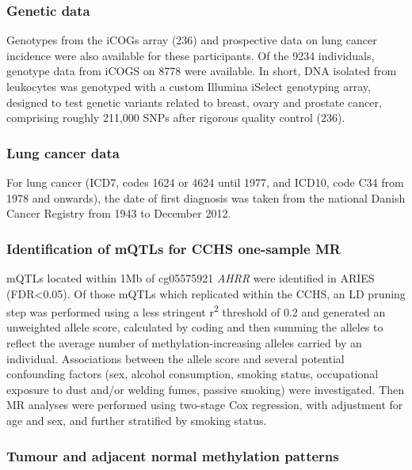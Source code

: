 \documentclass[11pt,oneside]{bristolthesis}
\begin{document}
\hypertarget{genetic-data}{%
\subsubsection{Genetic data}\label{genetic-data}}

Genotypes from the iCOGs array (236) and prospective data on lung cancer incidence were also available for these participants. Of the 9234 individuals, genotype data from iCOGS on 8778 were available. In short, DNA isolated from leukocytes was genotyped with a custom Illumina iSelect genotyping array, designed to test genetic variants related to breast, ovary and prostate cancer, comprising roughly 211,000 SNPs after rigorous quality control (236).

\hypertarget{lung-cancer-data}{%
\subsubsection{Lung cancer data}\label{lung-cancer-data}}

For lung cancer (ICD7, codes 1624 or 4624 until 1977, and ICD10, code C34 from 1978 and onwards), the date of first diagnosis was taken from the national Danish Cancer Registry from 1943 to December 2012.

\hypertarget{identification-of-mqtls-for-cchs-one-sample-mr}{%
\subsubsection{Identification of mQTLs for CCHS one-sample MR}\label{identification-of-mqtls-for-cchs-one-sample-mr}}

mQTLs located within 1Mb of cg05575921 \emph{AHRR} were identified in ARIES (FDR\textless0.05). Of those mQTLs which replicated within the CCHS, an LD pruning step was performed using a less stringent r\textsuperscript{2} threshold of 0.2 and generated an unweighted allele score, calculated by coding and then summing the alleles to reflect the average number of methylation-increasing alleles carried by an individual. Associations between the allele score and several potential confounding factors (sex, alcohol consumption, smoking status, occupational exposure to dust and/or welding fumes, passive smoking) were investigated. Then MR analyses were performed using two-stage Cox regression, with adjustment for age and sex, and further stratified by smoking status.

\hypertarget{lc-heathly-v-normal-methods}{%
\subsubsection{Tumour and adjacent normal methylation patterns}\label{lc-heathly-v-normal-methods}}
\end{document}
